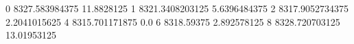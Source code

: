 0 8327.583984375 11.8828125
1 8321.3408203125 5.6396484375
2 8317.9052734375 2.2041015625
4 8315.701171875 0.0
6 8318.59375 2.892578125
8 8328.720703125 13.01953125
